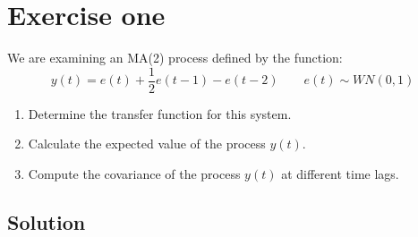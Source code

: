 \section{Exercise one}

We are examining an MA(2) process defined by the function:
\[y(t)=e(t)+\dfrac{1}{2}e(t-1)-e(t-2) \qquad e(t)\sim WN(0,1)\]
\begin{enumerate}
    \item Determine the transfer function for this system.
    \item Calculate the expected value of the process $y(t)$. 
    \item Compute the covariance of the process $y(t)$ at different time lags.
\end{enumerate}

\subsection{Solution}
